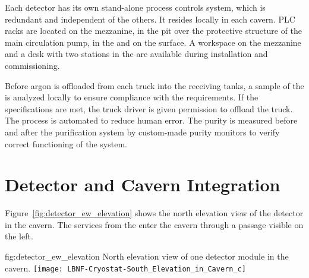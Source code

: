 Each detector has its own stand-alone process controls system, which is
redundant and independent of the others. It resides locally in each
cavern.  PLC racks are located on the mezzanine, in the pit over the
protective structure of the main  circulation pump, in the  and
on the surface. %
A workspace on the mezzanine and a desk with two stations in the   are available
during installation and commissioning.

Before argon is offloaded from each truck into the receiving tanks, a
sample of the  is analyzed locally to ensure compliance with the
requirements. If the specifications are met, the truck driver is given permission
 to offload the truck. The process is automated to reduce
human error. The purity is measured before and after the purification
system by custom-made purity monitors to verify correct
functioning of the system.


\section{Detector and Cavern Integration}
\label{sec:fdsp-coord-det-cav-integ}


Figure~\ref{fig:detector_ew_elevation} shows the north
elevation view of the detector in the cavern. The services from the
 enter the cavern through a passage visible on the left.
\begin{dunefigure}{fig:detector_ew_elevation}
  {North elevation view of one detector module in the cavern.}
  \texttt{[image: LBNF-Cryostat-South\_Elevation\_in\_Cavern\_c]}
\end{dunefigure}

